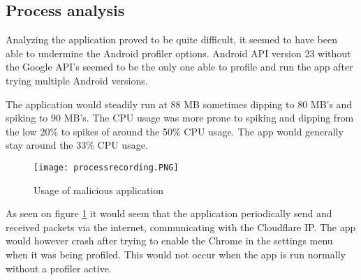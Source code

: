 \subsection{Process analysis}

Analyzing the application proved to be quite difficult, it seemed to have been able to undermine the Android profiler options.  
Android API version 23 without the Google API’s seemed to be the only one able to profile and run the app after trying multiple Android versions. 

The application would steadily run at 88 MB sometimes dipping to 80 MB’s and spiking to 90 MB’s. 
The CPU usage was more prone to spiking and dipping from the low 20\% to spikes of around the 50\% CPU usage. 
The app would generally stay around the 33\% CPU usage.

\begin{figure}[H]
    \texttt{[image: processrecording.PNG]}
    \caption{Usage of malicious application}
    \label{tim-process}
\end{figure}

As seen on figure \ref{tim-process} it would seem that the application periodically send and received packets via the internet, communicating with the Cloudflare IP. 
The app would however crash after trying to enable the Chrome in the settings menu when it was being profiled. 
This would not occur when the app is run normally without a profiler active. 